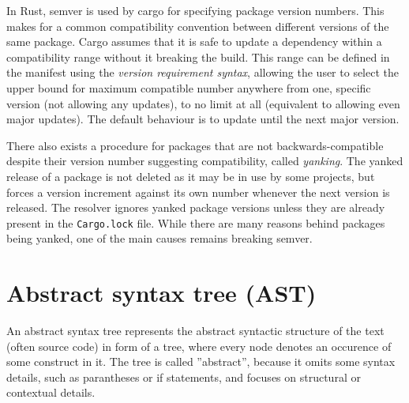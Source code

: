 \documentclass[licencjacka,en]{pracamgr}
\begin{document}
In Rust, semver is used by cargo for specifying package version numbers. This makes for a common
compatibility convention between different versions of the same package. Cargo assumes that
it is safe to update a dependency within a compatibility range without it breaking the build.
This range can be defined in the manifest using the \textit{version requirement syntax}, allowing
the user to select the upper bound for maximum compatible number anywhere from one, specific
version (not allowing any updates), to no limit at all (equivalent to allowing even major updates).
The default behaviour is to update until the next major version.


There also exists a procedure for packages that are not backwards-compatible despite their version
number suggesting compatibility, called \textit{yanking}. The yanked release of a package is not
deleted as it may be in use by some projects, but forces a version increment against its own number
whenever the next version is released. The resolver ignores yanked package versions unless they are
already present in the \texttt{Cargo.lock} file. While there are many reasons behind packages being
yanked, one of the main causes remains breaking semver.

\section{Abstract syntax tree (AST)}

An abstract syntax tree represents the abstract syntactic structure of the text (often source code)
in form of a tree, where every node denotes an occurence of some construct in it. The tree is
called ''abstract'', because it omits some syntax details, such as parantheses or if statements,
and focuses on structural or contextual details.
\end{document}
